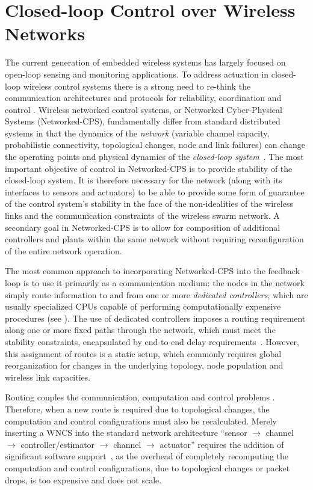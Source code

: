 \section{Closed-loop Control over Wireless Networks}
The current generation of embedded wireless systems has largely focused on open-loop sensing and monitoring applications. To address actuation in closed-loop wireless control systems there is a strong need to re-think the communication architectures and protocols for reliability, coordination and control \cite{wireless-ind}.  Wireless networked control systems, or Networked Cyber-Physical Systems (Networked-CPS),  fundamentally differ from standard distributed systems in that the dynamics of the \emph{network} (variable channel capacity, probabilistic connectivity, topological changes, node and link failures) can change the operating points and physical dynamics of the \emph{closed-loop system}~\cite{ncs_stability, ncs_survey}. The most important objective of control in Networked-CPS is to provide stability of the closed-loop system. It is therefore necessary for the network (along with its interfaces to sensors and actuators) to be able to provide some form of guarantee of the control system's stability in the face of the non-idealities of the wireless links and the communication constraints of the wireless swarm network. A secondary goal in Networked-CPS is to allow for composition of additional controllers and plants within the same network without requiring reconfiguration of the entire network operation.

The most common approach to incorporating Networked-CPS into the feedback loop is to use it primarily as a communication medium: the nodes in the network simply route information to and from one or more \emph{dedicated controllers}, which are usually specialized CPUs capable of performing computationally expensive procedures (see ). The use of dedicated controllers imposes a routing requirement along one or more fixed paths through the network, which must meet the stability constraints, encapsulated by end-to-end delay requirements~\cite{chenyang, evm_rtas10}. 
However, this assignment of routes is a static setup, which commonly requires global reorganization for changes in the underlying topology, node population and wireless link capacities. 

Routing couples the communication, computation and control problems \cite{alur_tac11,sched_TTA_HART,sched_TTA_scal}. Therefore, when a new route is required due to topological changes, the computation and control configurations must also be recalculated. Merely inserting a WNCS into the standard network architecture ``sensor $\rightarrow$ channel $\rightarrow$ controller/estimator $\rightarrow$ channel $\rightarrow$ actuator'' requires the addition of significant software support~\cite{evm_rtas10, etherware},  as the overhead of completely recomputing the computation and control configurations, due to topological changes or packet drops, is too expensive and does not scale.

